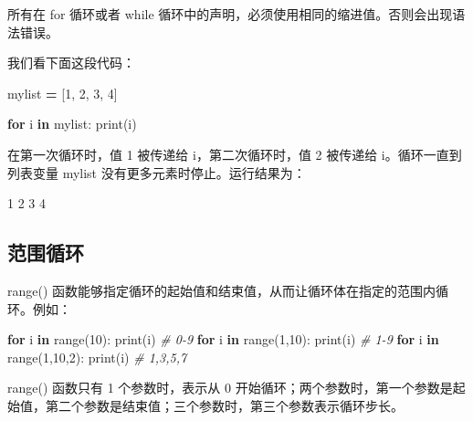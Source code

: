 \documentclass[]{ctexbook}
\newenvironment{Shaded}{\begin{snugshade}}{\end{snugshade}}
\newcommand{\BuiltInTok}[1]{#1}
\newcommand{\CommentTok}[1]{\textcolor[rgb]{0.56,0.35,0.01}{\textit{#1}}}
\newcommand{\ControlFlowTok}[1]{\textcolor[rgb]{0.13,0.29,0.53}{\textbf{#1}}}
\newcommand{\DecValTok}[1]{\textcolor[rgb]{0.00,0.00,0.81}{#1}}
\newcommand{\KeywordTok}[1]{\textcolor[rgb]{0.13,0.29,0.53}{\textbf{#1}}}
\newcommand{\NormalTok}[1]{#1}
\newcommand{\OperatorTok}[1]{\textcolor[rgb]{0.81,0.36,0.00}{\textbf{#1}}}
\begin{document}
所有在 for 循环或者 while 循环中的声明，必须使用相同的缩进值。否则会出现语法错误。

我们看下面这段代码：

\begin{Shaded}
\begin{Highlighting}[]
\NormalTok{mylist }\OperatorTok{=}\NormalTok{ [}\DecValTok{1}\NormalTok{, }\DecValTok{2}\NormalTok{, }\DecValTok{3}\NormalTok{, }\DecValTok{4}\NormalTok{]}

\ControlFlowTok{for}\NormalTok{ i }\KeywordTok{in}\NormalTok{ mylist:}
    \BuiltInTok{print}\NormalTok{(i)}
\end{Highlighting}
\end{Shaded}

在第一次循环时，值 1 被传递给 i，第二次循环时，值 2 被传递给 i。循环一直到列表变量 mylist 没有更多元素时停止。运行结果为：

\begin{Shaded}
\begin{Highlighting}[]
\DecValTok{1}
\DecValTok{2}
\DecValTok{3}
\DecValTok{4}
\end{Highlighting}
\end{Shaded}

\hypertarget{ux8303ux56f4ux5faaux73af}{%
\subsection{范围循环}\label{ux8303ux56f4ux5faaux73af}}

range() 函数能够指定循环的起始值和结束值，从而让循环体在指定的范围内循环。例如：

\begin{Shaded}
\begin{Highlighting}[]
\ControlFlowTok{for}\NormalTok{ i }\KeywordTok{in} \BuiltInTok{range}\NormalTok{(}\DecValTok{10}\NormalTok{):}
    \BuiltInTok{print}\NormalTok{(i)                    }\CommentTok{# 0-9}
\ControlFlowTok{for}\NormalTok{ i }\KeywordTok{in} \BuiltInTok{range}\NormalTok{(}\DecValTok{1}\NormalTok{,}\DecValTok{10}\NormalTok{):}
    \BuiltInTok{print}\NormalTok{(i)                    }\CommentTok{# 1-9}
\ControlFlowTok{for}\NormalTok{ i }\KeywordTok{in} \BuiltInTok{range}\NormalTok{(}\DecValTok{1}\NormalTok{,}\DecValTok{10}\NormalTok{,}\DecValTok{2}\NormalTok{):}
    \BuiltInTok{print}\NormalTok{(i)                    }\CommentTok{# 1,3,5,7}
\end{Highlighting}
\end{Shaded}

range() 函数只有 1 个参数时，表示从 0 开始循环；两个参数时，第一个参数是起始值，第二个参数是结束值；三个参数时，第三个参数表示循环步长。
\end{document}
